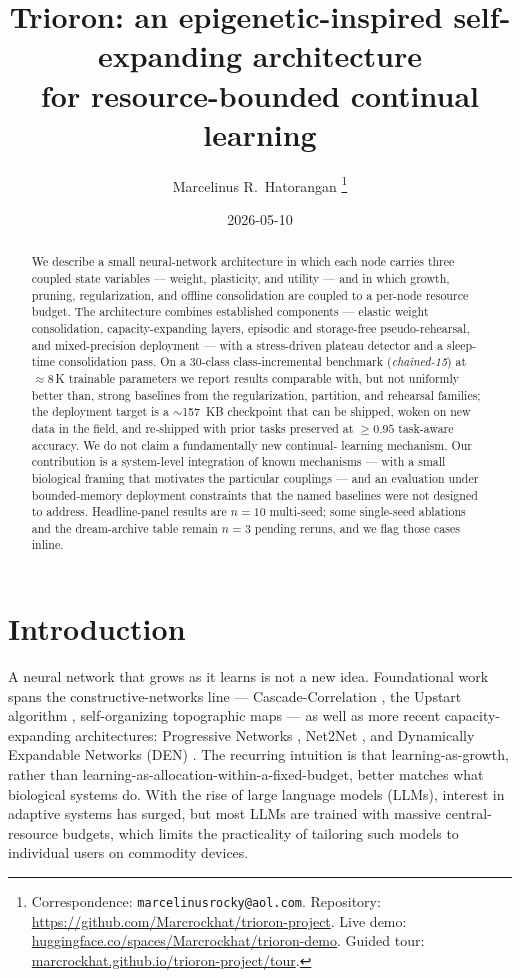 \documentclass[11pt]{article}
\title{Trioron: an epigenetic-inspired self-expanding architecture\\
       for resource-bounded continual learning}
\author{Marcelinus R.\ Hatorangan%
        \thanks{Correspondence: \texttt{marcelinusrocky@aol.com}.
                Repository: \url{https://github.com/Marcrockhat/trioron-project}.
                Live demo: \href{https://huggingface.co/spaces/Marcrockhat/trioron-demo}{huggingface.co/spaces/Marcrockhat/trioron-demo}.
                Guided tour: \href{https://marcrockhat.github.io/trioron-project/tour/}{marcrockhat.github.io/trioron-project/tour}.}}
\date{2026-05-10}
\begin{document}
\maketitle

\begin{abstract}
We describe a small neural-network architecture in which each node carries
three coupled state variables --- weight, plasticity, and utility --- and
in which growth, pruning, regularization, and offline consolidation are
coupled to a per-node resource budget. The architecture combines
established components --- elastic weight consolidation, capacity-expanding
layers, episodic and storage-free pseudo-rehearsal, and mixed-precision
deployment --- with a stress-driven plateau detector and a
sleep-time consolidation pass. On a 30-class class-incremental benchmark
(\emph{chained-15}) at $\approx 8\,$K trainable parameters we report
results comparable with, but not uniformly better than, strong baselines
from the regularization, partition, and rehearsal families; the deployment
target is a $\sim$157~KB checkpoint that can be shipped, woken on new
data in the field, and re-shipped with prior tasks preserved at $\geq
0.95$ task-aware accuracy. We do not claim a fundamentally new continual-
learning mechanism. Our contribution is a system-level integration of
known mechanisms --- with a small biological framing that motivates the
particular couplings --- and an evaluation under bounded-memory deployment
constraints that the named baselines were not designed to address.
Headline-panel results are $n = 10$ multi-seed; some single-seed
ablations and the dream-archive table remain $n = 3$ pending reruns,
and we flag those cases inline.
\end{abstract}


\section{Introduction}
\label{sec:intro}

A neural network that grows as it learns is not a new idea. Foundational
work spans the constructive-networks line --- Cascade-Correlation
\citep{fahlman1990cascade}, the Upstart algorithm \citep{frean1990upstart},
self-organizing topographic maps \citep{kohonen1982som} --- as well as
more recent capacity-expanding architectures: Progressive Networks
\citep{rusu2016progressive}, Net2Net \citep{chen2016net2net}, and
Dynamically Expandable Networks (DEN) \citep{yoon2018den}. The recurring
intuition is that learning-as-growth, rather than
learning-as-allocation-within-a-fixed-budget, better matches what
biological systems do. With the rise of large language models (LLMs), interest
in adaptive systems has surged, but most LLMs are trained with massive
central-resource budgets, which limits the practicality of tailoring such
models to individual users on commodity devices.
\end{document}
